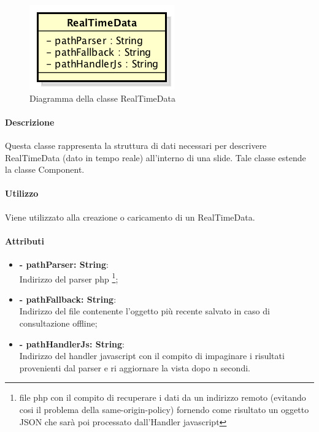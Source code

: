 	\begin{figure}[h]
		\centering
		\includegraphics[width=0.4\linewidth]{img/premi_front_end_model_realtimedata}
		\caption[Diagramma della classe RealTimeData]{Diagramma della classe RealTimeData}
		\label{fig:back_end_premi_model_realTimeData}
	\end{figure}
	
	\paragraph{Descrizione}
	Questa classe rappresenta la struttura di dati necessari per descrivere RealTimeData (dato in tempo reale) all'interno di una \gls{slide}. Tale classe estende la classe Component.
	
	\paragraph{Utilizzo}
	Viene utilizzato alla creazione o caricamento di un RealTimeData.
	
	\paragraph{Attributi}
	\begin{itemize}
		\item \textbf{- pathParser: String}:\\
			Indirizzo del \gls{parser} \gls{php} \footnote{file \gls{php} con il compito di recuperare i dati da un indirizzo remoto (evitando cosi il problema della same-origin-policy) fornendo come risultato un oggetto \gls{JSON} che sarà poi processato dall'Handler \gls{javascript}};
		\item \textbf{- pathFallback: String}:\\
			Indirizzo del file contenente l'oggetto più recente salvato in caso di consultazione offline;
		\item \textbf{- pathHandlerJs: String}:\\
			Indirizzo del handler \gls{javascript} con il compito di impaginare i risultati provenienti dal \gls{parser} e ri aggiornare la vista dopo n secondi.
	\end{itemize}



